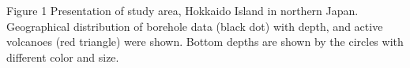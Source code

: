 Figure 1 Presentation of study area, Hokkaido Island in northern Japan. Geographical distribution of borehole data (black dot) with depth, and active volcanoes (red triangle) were shown. Bottom depths are shown by the circles with different color and size.


